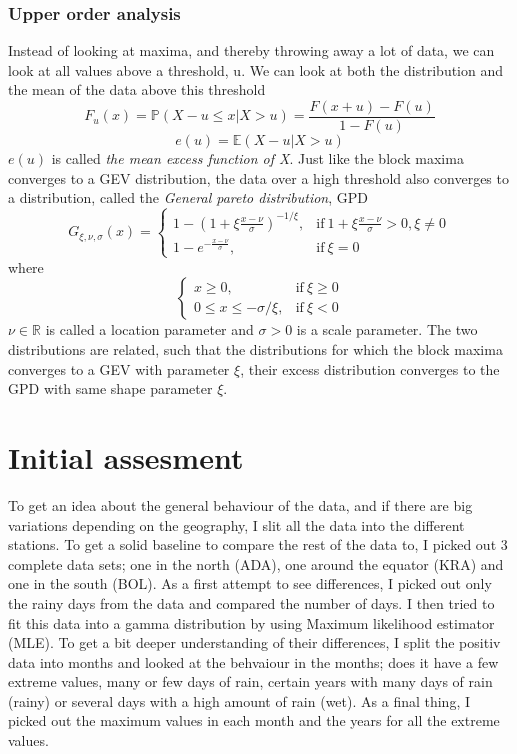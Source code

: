 \documentclass{article}
\begin{document}
		\subsubsection{Upper order analysis}
		Instead of looking at maxima, and thereby throwing away a lot of data, we can look at all values above a threshold, u. We can look at both the distribution and the mean of the data above this threshold
		\begin{equation}
		F_u(x) = \mathbb{P}(X - u \leq x | X > u) = \frac{F(x + u) - F(u)}{1 - F(u)}
		\end{equation}
		\begin{equation}
		e(u) = \mathbb{E}(X - u | X > u)
		\end{equation}
		$e(u)$ is called \textit{the mean excess function of X}. Just like the block maxima converges to a GEV distribution, the data over a high threshold also converges to a distribution, called the \textit{General pareto distribution}, GPD
		\begin{equation}
			G_{\xi, \nu, \sigma}(x) =
				\begin{cases}
				1-(1+\xi \frac{x-\nu}{\sigma})^{-1/\xi}, & \text{if} \ 1+\xi \frac{x-\nu}{\sigma} > 0, \xi \neq 0 \\
				1- e^{-\frac{x-\nu}{\sigma}}, & \text{if} \  \xi = 0
				\end{cases}
		\end{equation}
		where
		\begin{equation}
			\begin{cases}
				x \geq 0, & \text{if} \ \xi \geq 0 \\
				0 \leq x \leq -\sigma/ \xi, & \text{if} \ \xi < 0
		\end{cases}
		\end{equation}
		$\nu \in \mathbb{R}$ is called a location parameter and $\sigma>0$ is a scale parameter. The two distributions are related, such that the distributions for which the block maxima converges to a GEV with parameter $\xi$, their excess distribution converges to the GPD with same shape parameter $\xi$. 
		
	\section{Initial assesment}
	To get an idea about the general behaviour of the data, and if there are big variations depending on the geography, I slit all the data into the different stations. To get a solid baseline to compare the rest of the data to, I picked out 3 complete data sets; one in the north (ADA), one around the equator (KRA) and one in the south (BOL). As a first attempt to see differences, I picked out only the rainy days from the data and compared the number of days. I then tried to fit this data into a gamma distribution by using Maximum likelihood estimator (MLE). To get a bit deeper understanding of their differences, I split the positiv data into months and looked at the behvaiour in the months; does it have a few extreme values, many or few days of rain, certain years with many days of rain (rainy) or several days with a high amount of rain (wet). As a final thing, I picked out the maximum values in each month and the years for all the extreme values.
	
\end{document}
